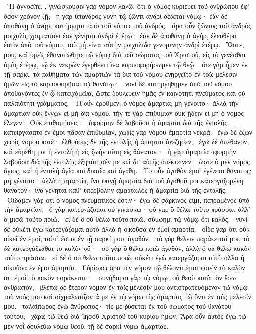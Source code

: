 ~Ἢ ἀγνοεῖτε, , γινώσκουσιν γὰρ νόμον λαλῶ, ὅτι ὁ νόμος κυριεύει τοῦ ἀνθρώπου ἐφ’ ὅσον χρόνον ζῇ;
~ἡ γὰρ ὕπανδρος γυνὴ τῷ ζῶντι ἀνδρὶ δέδεται νόμῳ· ἐὰν δὲ ἀποθάνῃ ὁ ἀνήρ, κατήργηται ἀπὸ τοῦ νόμου τοῦ ἀνδρός.
~ἄρα οὖν ζῶντος τοῦ ἀνδρὸς μοιχαλὶς χρηματίσει ἐὰν γένηται ἀνδρὶ ἑτέρῳ· ἐὰν δὲ ἀποθάνῃ ὁ ἀνήρ, ἐλευθέρα ἐστὶν ἀπὸ τοῦ νόμου, τοῦ μὴ εἶναι αὐτὴν μοιχαλίδα γενομένην ἀνδρὶ ἑτέρῳ.
~Ὥστε,  μου, καὶ ὑμεῖς ἐθανατώθητε τῷ νόμῳ διὰ τοῦ σώματος τοῦ Χριστοῦ, εἰς τὸ γενέσθαι ὑμᾶς ἑτέρῳ, τῷ ἐκ νεκρῶν ἐγερθέντι ἵνα καρποφορήσωμεν τῷ θεῷ.
~ὅτε γὰρ ἦμεν ἐν τῇ σαρκί, τὰ παθήματα τῶν ἁμαρτιῶν τὰ διὰ τοῦ νόμου ἐνηργεῖτο ἐν τοῖς μέλεσιν ἡμῶν εἰς τὸ καρποφορῆσαι τῷ θανάτῳ·
~νυνὶ δὲ κατηργήθημεν ἀπὸ τοῦ νόμου, ἀποθανόντες ἐν ᾧ κατειχόμεθα, ὥστε δουλεύειν ἡμᾶς ἐν καινότητι πνεύματος καὶ οὐ παλαιότητι γράμματος.
~Τί οὖν ἐροῦμεν; ὁ νόμος ἁμαρτία; μὴ γένοιτο· ἀλλὰ τὴν ἁμαρτίαν οὐκ ἔγνων εἰ μὴ διὰ νόμου, τήν τε γὰρ ἐπιθυμίαν οὐκ ᾔδειν εἰ μὴ ὁ νόμος ἔλεγεν· Οὐκ ἐπιθυμήσεις·
~ἀφορμὴν δὲ λαβοῦσα ἡ ἁμαρτία διὰ τῆς ἐντολῆς κατειργάσατο ἐν ἐμοὶ πᾶσαν ἐπιθυμίαν, χωρὶς γὰρ νόμου ἁμαρτία νεκρά.
~ἐγὼ δὲ ἔζων χωρὶς νόμου ποτέ· ἐλθούσης δὲ τῆς ἐντολῆς ἡ ἁμαρτία ἀνέζησεν,
~ἐγὼ δὲ ἀπέθανον, καὶ εὑρέθη μοι ἡ ἐντολὴ ἡ εἰς ζωὴν αὕτη εἰς θάνατον·
~ἡ γὰρ ἁμαρτία ἀφορμὴν λαβοῦσα διὰ τῆς ἐντολῆς ἐξηπάτησέν με καὶ δι’ αὐτῆς ἀπέκτεινεν.
~ὥστε ὁ μὲν νόμος ἅγιος, καὶ ἡ ἐντολὴ ἁγία καὶ δικαία καὶ ἀγαθή.
~Τὸ οὖν ἀγαθὸν ἐμοὶ ἐγένετο θάνατος; μὴ γένοιτο· ἀλλὰ ἡ ἁμαρτία, ἵνα φανῇ ἁμαρτία διὰ τοῦ ἀγαθοῦ μοι κατεργαζομένη θάνατον· ἵνα γένηται καθ’ ὑπερβολὴν ἁμαρτωλὸς ἡ ἁμαρτία διὰ τῆς ἐντολῆς.
~Οἴδαμεν γὰρ ὅτι ὁ νόμος πνευματικός ἐστιν· ἐγὼ δὲ σάρκινός εἰμι, πεπραμένος ὑπὸ τὴν ἁμαρτίαν.
~ὃ γὰρ κατεργάζομαι οὐ γινώσκω· οὐ γὰρ ὃ θέλω τοῦτο πράσσω, ἀλλ’ ὃ μισῶ τοῦτο ποιῶ.
~εἰ δὲ ὃ οὐ θέλω τοῦτο ποιῶ, σύμφημι τῷ νόμῳ ὅτι καλός.
~νυνὶ δὲ οὐκέτι ἐγὼ κατεργάζομαι αὐτὸ ἀλλὰ ἡ οἰκοῦσα ἐν ἐμοὶ ἁμαρτία.
~οἶδα γὰρ ὅτι οὐκ οἰκεῖ ἐν ἐμοί, τοῦτ’ ἔστιν ἐν τῇ σαρκί μου, ἀγαθόν· τὸ γὰρ θέλειν παράκειταί μοι, τὸ δὲ κατεργάζεσθαι τὸ καλὸν οὔ·
~οὐ γὰρ ὃ θέλω ποιῶ ἀγαθόν, ἀλλὰ ὃ οὐ θέλω κακὸν τοῦτο πράσσω.
~εἰ δὲ ὃ οὐ θέλω τοῦτο ποιῶ, οὐκέτι ἐγὼ κατεργάζομαι αὐτὸ ἀλλὰ ἡ οἰκοῦσα ἐν ἐμοὶ ἁμαρτία.
~Εὑρίσκω ἄρα τὸν νόμον τῷ θέλοντι ἐμοὶ ποιεῖν τὸ καλὸν ὅτι ἐμοὶ τὸ κακὸν παράκειται·
~συνήδομαι γὰρ τῷ νόμῳ τοῦ θεοῦ κατὰ τὸν ἔσω ἄνθρωπον,
~βλέπω δὲ ἕτερον νόμον ἐν τοῖς μέλεσίν μου ἀντιστρατευόμενον τῷ νόμῳ τοῦ νοός μου καὶ αἰχμαλωτίζοντά με ἐν τῷ νόμῳ τῆς ἁμαρτίας τῷ ὄντι ἐν τοῖς μέλεσίν μου.
~ταλαίπωρος ἐγὼ ἄνθρωπος· τίς με ῥύσεται ἐκ τοῦ σώματος τοῦ θανάτου τούτου;
~χάρις τῷ θεῷ διὰ Ἰησοῦ Χριστοῦ τοῦ κυρίου ἡμῶν. Ἄρα οὖν αὐτὸς ἐγὼ τῷ μὲν νοῒ δουλεύω νόμῳ θεοῦ, τῇ δὲ σαρκὶ νόμῳ ἁμαρτίας.

